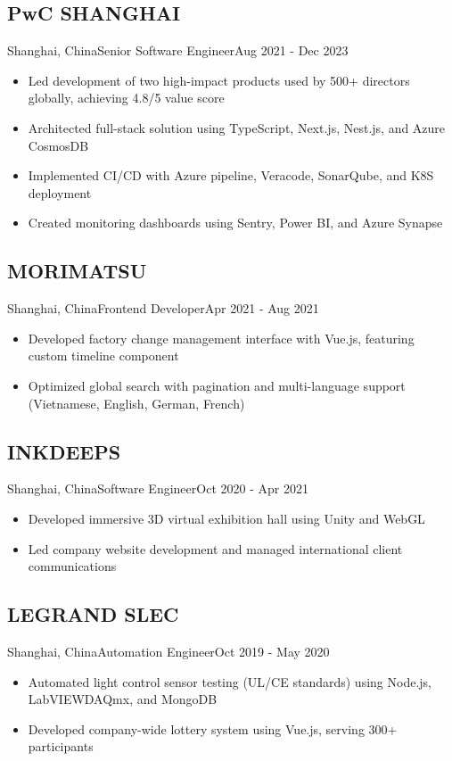 \subsection{PwC SHANGHAI}{Shanghai, China}{Senior Software Engineer}{Aug 2021 - Dec 2023}
\begin{itemize}
\item Led development of two high-impact products used by 500+ directors globally, achieving 4.8/5 value score
\item Architected full-stack solution using TypeScript, Next.js, Nest.js, and Azure CosmosDB
\item Implemented CI/CD with Azure pipeline, Veracode, SonarQube, and K8S deployment
\item Created monitoring dashboards using Sentry, Power BI, and Azure Synapse
\end{itemize}

\subsection{MORIMATSU}{Shanghai, China}{Frontend Developer}{Apr 2021 - Aug 2021}
\begin{itemize}
\item Developed factory change management interface with Vue.js, featuring custom timeline component
\item Optimized global search with pagination and multi-language support (Vietnamese, English, German, French)
\end{itemize}

\subsection{INKDEEPS}{Shanghai, China}{Software Engineer}{Oct 2020 - Apr 2021}
\begin{itemize}
\item Developed immersive 3D virtual exhibition hall using Unity and WebGL
\item Led company website development and managed international client communications
\end{itemize}

\subsection{LEGRAND SLEC}{Shanghai, China}{Automation Engineer}{Oct 2019 - May 2020}
\begin{itemize}
\item Automated light control sensor testing (UL/CE standards) using Node.js, LabVIEWDAQmx, and MongoDB
\item Developed company-wide lottery system using Vue.js, serving 300+ participants
\end{itemize}

